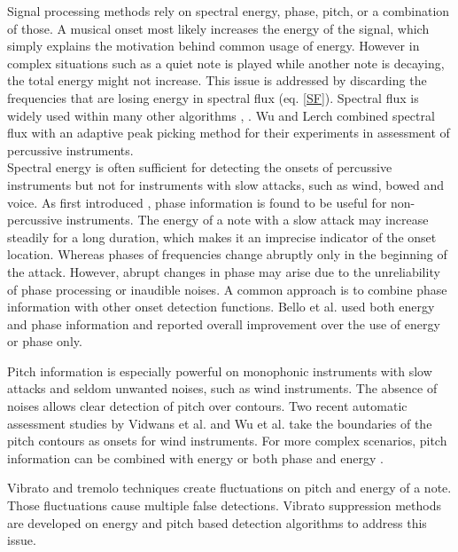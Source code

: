 Signal processing methods rely on spectral energy, phase, pitch, or a combination of those. A musical onset most likely increases the energy of the signal, which simply explains the motivation behind common usage of energy. However in complex situations such as a quiet note is played while another note is decaying, the total energy might not increase. This issue is addressed by discarding the frequencies that are losing energy in spectral flux \cite{spectralflux} (eq. \ref{SF}). Spectral flux is widely used within many other algorithms \cite{holzapfel2009three}, \cite{bock2013maximum}. Wu and Lerch \cite{wu2018learned} combined spectral flux with an adaptive peak picking method for their experiments in assessment of percussive instruments.\\
Spectral energy is often sufficient for detecting the onsets of percussive instruments but not for instruments with slow attacks, such as wind, bowed and voice. As first introduced \cite{bello2003phase}, phase information is found to be useful for non-percussive instruments. The energy of a note with a slow attack may increase steadily for a long duration, which makes it an imprecise indicator of the onset location. Whereas phases of frequencies change abruptly only in the beginning of the attack. However, abrupt changes in phase may arise due to the unreliability of phase processing \cite{holzapfel2009three} or inaudible noises. A common approach is to combine phase information with other onset detection functions. Bello et al. \cite{bello2004use} used both energy and phase information and reported overall improvement over the use of energy or phase only.

Pitch information is especially powerful on monophonic instruments with slow attacks and seldom unwanted noises, such as wind instruments. The absence of noises allows clear detection of pitch over contours. Two recent automatic assessment studies by Vidwans et al. \cite{vidwansobj} and Wu et al. \cite{wu2016towards} take the boundaries of the pitch contours as onsets for wind instruments. For more complex scenarios, pitch information can be combined with energy \cite{tan2010audio} \cite{zhou2007music} or both phase and energy \cite{brossier2004fast} \cite{holzapfel2009three}.

Vibrato and tremolo techniques create fluctuations on pitch and energy of a note. Those fluctuations cause multiple false detections. Vibrato suppression methods are developed on energy \cite{bock2013maximum} and pitch based \cite{collins2005using} detection algorithms to address this issue. 

